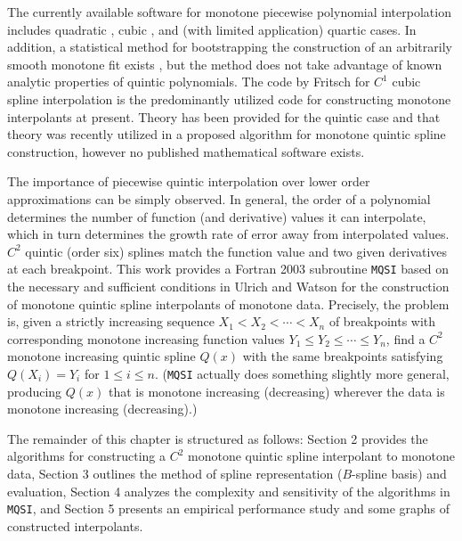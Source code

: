 The currently available software for monotone piecewise polynomial
interpolation includes quadratic \cite{he1998monotone},
cubic \cite{fritsch1980monotone}, and (with limited application) quartic
\cite{wang2004rational,abd2011improved,yao2018unconditionally} cases. In
addition, a statistical method for bootstrapping the construction of
an arbitrarily smooth monotone fit exists \cite{leitenstorfer2007generalized},
but the method does not take advantage of known analytic
properties of quintic polynomials. The code by Fritsch \cite{fritsch1982piecewise} for
$C^1$ cubic spline interpolation is the predominantly utilized code
for constructing monotone interpolants at present. Theory has been
provided for the quintic case \cite{ulrich1994positivity,hess1994positive}
and that theory was recently utilized in a proposed
algorithm \cite{lux2020algorithm} for monotone quintic spline construction, however
no published mathematical software exists.

The importance of piecewise quintic interpolation over lower order
approximations can be simply observed. In general, the order of a
polynomial determines the number of function (and derivative) values
it can interpolate, which in turn determines the growth rate of error
away from interpolated values. $C^2$ quintic (order six) splines
match the function value and two given derivatives at each breakpoint.
This work provides a Fortran 2003 subroutine {\tt MQSI} based on the
necessary and sufficient conditions in Ulrich and Watson \cite{ulrich1994positivity} for the
construction of monotone quintic spline interpolants of monotone data.
Precisely, the problem is, given a strictly increasing sequence $X_1<X_2<
\cdots <X_n$ of breakpoints with corresponding monotone increasing
function values $Y_1\le Y_2\le \cdots \le Y_n$, find a $C^2$ monotone
increasing quintic spline $Q(x)$ with the same breakpoints satisfying
$Q(X_i)=Y_i$ for $1\le i\le n$. ({\tt MQSI} actually does something slightly
more general, producing $Q(x)$ that is monotone increasing (decreasing)
wherever the data is monotone increasing (decreasing).)

The remainder of this chapter is structured as follows: Section 2 provides
the algorithms for constructing a $C^2$ monotone quintic spline interpolant
to monotone data, Section 3 outlines the method of spline representation
($B$-spline basis) and evaluation, Section 4 analyzes the complexity and
sensitivity of the algorithms in {\tt MQSI}, and Section 5 presents an
empirical performance study and some graphs of constructed interpolants.

